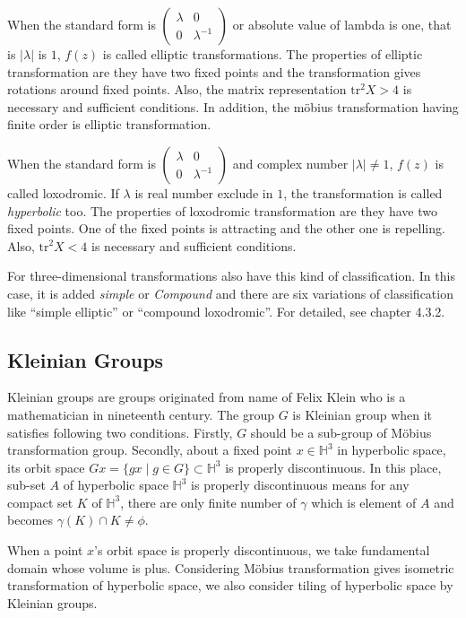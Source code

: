 When the standard form is
$\begin{pmatrix}\lambda & 0 \\ 0 & \lambda^{-1} \end{pmatrix}$
or absolute value of lambda is one, that is  $|\lambda|$ is $1$, 
$f(z)$ is called elliptic transformations.
The properties of elliptic transformation are they have
two fixed points and the transformation gives rotations around fixed
points.
Also, the matrix representation $\mathrm{tr}^2X > 4$ is 
necessary and sufficient conditions.
In addition, the m\"obius transformation having finite order
is elliptic transformation.

When the standard form is
$\begin{pmatrix}\lambda & 0 \\ 0 & \lambda^{-1} \end{pmatrix}$
and complex number $|\lambda| \neq 1$, $f(z)$ is called loxodromic.
If $\lambda$ is real number exclude in $1$, the transformation is called
\textit{hyperbolic} too.
The properties of loxodromic transformation are they have two fixed
points. One of the fixed points is attracting and the other one is repelling.
Also, $\mathrm{tr}^2X < 4$ is necessary and sufficient conditions.

For three-dimensional transformations also have this kind of
classification.
In this case, it is added \textit{simple} or \textit{Compound} and
there are six variations of classification like ``simple elliptic'' or
``compound loxodromic''.
For detailed, see chapter 4.3.2.

\subsection{Kleinian Groups}

Kleinian groups are groups originated from name of Felix Klein who is
a mathematician in nineteenth century.
The group $G$ is Kleinian group when it satisfies following two
conditions. 
Firstly, $G$ should be a sub-group of M\"obius transformation group.
Secondly, about a fixed point $x\in\mathbb{H}^3$ in hyperbolic space,
its orbit space $Gx = \{ gx \mid g\in G\}\subset \mathbb{H}^3$
is properly discontinuous.
In this place, sub-set $A$ of hyperbolic space $\mathbb{H}^3$
is properly discontinuous means
for any compact set $K$ of $\mathbb{H}^3$,
there are only finite number of $\gamma$ which is element of $A$
and becomes $\gamma (K) \cap K \neq \phi$.

When a point $x$'s orbit space is properly discontinuous, we take
fundamental domain whose volume is plus.
Considering M\"obius transformation gives isometric transformation of
hyperbolic space, we also consider tiling of hyperbolic space by
Kleinian groups. 

